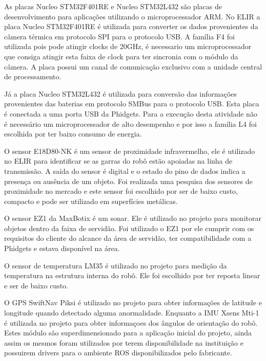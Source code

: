 As placas Nucleo STM32F401RE  e   Nucleo STM32L432 são placas de desenvolvimento para aplicações utilizando o microprocessador ARM. No ELIR a placa Nucleo STM32F401RE é utilizada para converter os dados provenientes da câmera térmica em protocolo SPI para o protocolo USB. A família  F4 foi utilizada pois pode atingir clocks de 20GHz, é necessario um microprocessador que consiga atingir esta faixa de clock para ter sincronia com o módulo da câmera. A placa possui um canal de comunicação exclusivo com a unidade central de processamento.

Já a placa  Nucleo STM32L432 é utilizada para conversão das informações provenientes das baterias em protocolo SMBus para o protocolo USB. Esta placa é conectada a uma porta USB da Phidgets. Para a execução desta atividade não é necessário um microprocessador de alto desempenho e por isso a família L4 foi escolhida por ter  baixo consumo de energia.



O sensor E18D80-NK é um sensor de proximidade infravermelho, ele é utilizado no ELIR para identificar se as garras do robô estão apoiadas na linha de transmissão. A saída do sensor é digital e o estado do pino  de dados indica a presença ou ausência de um objeto. Foi realizada uma pesquisa dos sensores de proximidade no mercado e este sensor foi escolhido por ser de baixo custo, compacto e pode ser utilizado em superfícies metálicas.

O sensor EZ1 da MaxBotix é um sonar. Ele é utilizado no projeto para monitorar objetos dentro da faixa de servidão. Foi utilizado o EZ1 por ele cumprir com os requisitos do cliente do alcance da área de servidão, ter compatibilidade com a Phidgets e estava disponível na área.

O sensor de temperatura LM35 é utilizado no projeto para medição da temperatura na estrutura interna do robô. Ele foi escolhido por ter reposta linear e ser de baixo custo.



O GPS SwiftNav Piksi é utilizado no projeto para obter informações de latitude e longitude quando detectado alguma anormalidade. Enquanto a IMU Xsens Mti-1 é utilizada no projeto para obter informaçoes dos ângulos de orientação do robô. Estes módulo são superdimensionado para a aplicação inicial do projeto, ainda assim os mesmos foram utilizados por terem disponibilidade na instituição e possuirem drivers para o ambiente ROS disponibilizados pelo fabricante.



